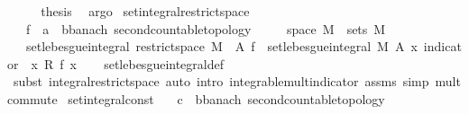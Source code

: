 \begin{isabellebody}
\ \ \isamarkupfalse%
\ \isamarkupfalse%
\ {\isacharquery}{\kern0pt}thesis\ \isamarkupfalse%
\ argo\isanewline
{}\isamarkupfalse%
%
\endisatagproof
{\isafoldproof}%
%
\isadelimproof
\isanewline
%
\endisadelimproof
\isanewline
{}\isamarkupfalse%
\ set{\isacharunderscore}{\kern0pt}integral{\isacharunderscore}{\kern0pt}restrict{\isacharunderscore}{\kern0pt}space{\isacharcolon}{\kern0pt}\isanewline
\ \ \ f\ {\isacharcolon}{\kern0pt}{\isacharcolon}{\kern0pt}\ {\isachardoublequoteopen}{\isacharprime}{\kern0pt}a\ {\isasymRightarrow}\ {\isacharprime}{\kern0pt}b{\isacharcolon}{\kern0pt}{\isacharcolon}{\kern0pt}{\isacharbraceleft}{\kern0pt}banach{\isacharcomma}{\kern0pt}\ second{\isacharunderscore}{\kern0pt}countable{\isacharunderscore}{\kern0pt}topology{\isacharbraceright}{\kern0pt}{\isachardoublequoteclose}\isanewline
\ \ \ {\isachardoublequoteopen}{\isasymOmega}\ {\isasyminter}\ space\ M\ {\isasymin}\ sets\ M{\isachardoublequoteclose}\isanewline
\ \ \ {\isachardoublequoteopen}set{\isacharunderscore}{\kern0pt}lebesgue{\isacharunderscore}{\kern0pt}integral\ {\isacharparenleft}{\kern0pt}restrict{\isacharunderscore}{\kern0pt}space\ M\ {\isasymOmega}{\isacharparenright}{\kern0pt}\ A\ f\ {\isacharequal}{\kern0pt}\ set{\isacharunderscore}{\kern0pt}lebesgue{\isacharunderscore}{\kern0pt}integral\ M\ A\ {\isacharparenleft}{\kern0pt}{\isasymlambda}x{\isachardot}{\kern0pt}\ indicator\ {\isasymOmega}\ x\ {\isacharasterisk}{\kern0pt}\isactrlsub R\ f\ x{\isacharparenright}{\kern0pt}{\isachardoublequoteclose}\isanewline
%
\isadelimproof
\ \ %
\endisadelimproof
%
\isatagproof
{}\isamarkupfalse%
\ set{\isacharunderscore}{\kern0pt}lebesgue{\isacharunderscore}{\kern0pt}integral{\isacharunderscore}{\kern0pt}def\ \isanewline
\ \ \isamarkupfalse%
\ {\isacharparenleft}{\kern0pt}subst\ integral{\isacharunderscore}{\kern0pt}restrict{\isacharunderscore}{\kern0pt}space{\isacharcomma}{\kern0pt}\ auto\ intro{\isacharbang}{\kern0pt}{\isacharcolon}{\kern0pt}\ integrable{\isacharunderscore}{\kern0pt}mult{\isacharunderscore}{\kern0pt}indicator\ assms\ simp{\isacharcolon}{\kern0pt}\ mult{\isachardot}{\kern0pt}commute{\isacharparenright}{\kern0pt}%
\endisatagproof
{\isafoldproof}%
%
\isadelimproof
\isanewline
%
\endisadelimproof
\isanewline
{}\isamarkupfalse%
\ set{\isacharunderscore}{\kern0pt}integral{\isacharunderscore}{\kern0pt}const{\isacharcolon}{\kern0pt}\isanewline
\ \ \ c\ {\isacharcolon}{\kern0pt}{\isacharcolon}{\kern0pt}\ {\isachardoublequoteopen}{\isacharprime}{\kern0pt}b{\isacharcolon}{\kern0pt}{\isacharcolon}{\kern0pt}{\isacharbraceleft}{\kern0pt}banach{\isacharcomma}{\kern0pt}\ second{\isacharunderscore}{\kern0pt}countable{\isacharunderscore}{\kern0pt}topology{\isacharbraceright}{\kern0pt}{\isachardoublequoteclose}\isanewline

\end{isabellebody}
